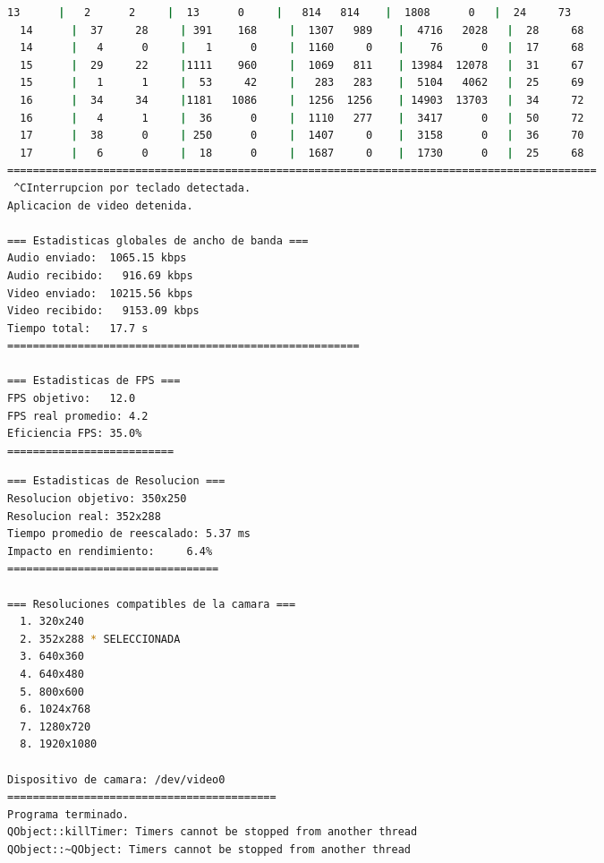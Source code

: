 \begin{adjustbox}{max width=\textwidth}
\begin{lstlisting}[language=bash,basicstyle=\ttfamily\scriptsize]
  13      |   2      2     |  13      0     |   814   814    |  1808      0   |  24     73
  14      |  37     28     | 391    168     |  1307   989    |  4716   2028   |  28     68
  14      |   4      0     |   1      0     |  1160     0    |    76      0   |  17     68
  15      |  29     22     |1111    960     |  1069   811    | 13984  12078   |  31     67
  15      |   1      1     |  53     42     |   283   283    |  5104   4062   |  25     69
  16      |  34     34     |1181   1086     |  1256  1256    | 14903  13703   |  34     72
  16      |   4      1     |  36      0     |  1110   277    |  3417      0   |  50     72
  17      |  38      0     | 250      0     |  1407     0    |  3158      0   |  36     70
  17      |   6      0     |  18      0     |  1687     0    |  1730      0   |  25     68
============================================================================================
 ^CInterrupcion por teclado detectada.
Aplicacion de video detenida.

=== Estadisticas globales de ancho de banda ===
Audio enviado:	1065.15 kbps
Audio recibido:   916.69 kbps
Video enviado:	10215.56 kbps
Video recibido:   9153.09 kbps
Tiempo total: 	17.7 s
=======================================================

=== Estadisticas de FPS ===
FPS objetivo: 	12.0
FPS real promedio: 4.2
Eficiencia FPS:	35.0%
==========================
\end{lstlisting}
\end{adjustbox}

\begin{adjustbox}{max width=\textwidth}
\begin{lstlisting}[language=bash,basicstyle=\ttfamily\scriptsize]
=== Estadisticas de Resolucion ===
Resolucion objetivo: 350x250
Resolucion real: 352x288
Tiempo promedio de reescalado: 5.37 ms
Impacto en rendimiento:    	6.4%
=================================

=== Resoluciones compatibles de la camara ===
  1. 320x240
  2. 352x288 * SELECCIONADA
  3. 640x360
  4. 640x480
  5. 800x600
  6. 1024x768
  7. 1280x720
  8. 1920x1080

Dispositivo de camara: /dev/video0
==========================================
Programa terminado.
QObject::killTimer: Timers cannot be stopped from another thread
QObject::~QObject: Timers cannot be stopped from another thread
\end{lstlisting}
\end{adjustbox}

\newpage

